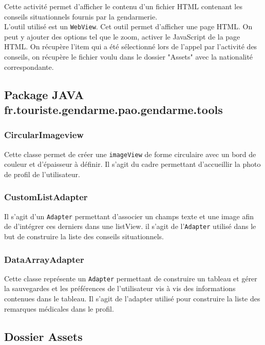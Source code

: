 	Cette activité permet d'afficher le contenu d'un fichier HTML contenant les conseils situationnels fournis par la gendarmerie.
	\\
	
	L'outil utilisé est un \texttt{WebView}. Cet outil permet d'afficher une page HTML. On peut y ajouter des options tel que le zoom, activer le JavaScript de la page HTML. On récupère l'item qui a été sélectionné lors de l'appel par l'activité des conseils, on récupère le fichier voulu dans le dossier "Assets" avec la nationalité correspondante. 
	
	
\subsection{Package JAVA fr.touriste.gendarme.pao.gendarme.tools}

\subsubsection{CircularImageview}
	
	Cette classe permet de créer une \texttt{imageView} de forme circulaire avec un bord de couleur et d'épaisseur à définir. Il s'agit du cadre permettant d'accueillir la photo de profil de l'utilisateur. 

\subsubsection{CustomListAdapter}
	
	Il s'agit d'un \texttt{Adapter} permettant d'associer un champs texte et une image afin de d'intégrer ces derniers dans une listView. il s'agit de l'\texttt{Adapter} utilisé dans le but de construire la liste des conseils situationnels.
	
\subsubsection{DataArrayAdapter}

	Cette classe représente un \texttt{Adapter} permettant de construire un tableau et gérer la sauvegardes et les préférences de l'utilisateur vis à vis des informations contenues dans le tableau. Il s'agit de l'adapter utilisé pour construire la liste des remarques médicales dans le profil.
	
	
\subsection{Dossier Assets}
	
